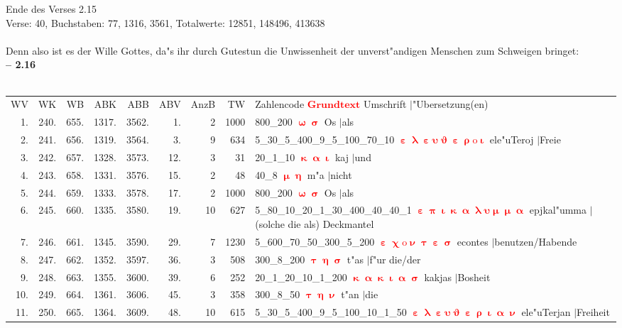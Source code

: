 \documentclass[a4paper,10pt,landscape]{article}
\begin{document}
Ende des Verses 2.15\\
Verse: 40, Buchstaben: 77, 1316, 3561, Totalwerte: 12851, 148496, 413638\\
\\
Denn also ist es der Wille Gottes, da"s ihr durch Gutestun die Unwissenheit der unverst"andigen Menschen zum Schweigen bringet:\\
\newpage 
{\bf -- 2.16}\\
\medskip \\
\begin{tabular}{rrrrrrrrp{120mm}}
WV&WK&WB&ABK&ABB&ABV&AnzB&TW&Zahlencode \textcolor{red}{$\boldsymbol{Grundtext}$} Umschrift $|$"Ubersetzung(en)\\
1.&240.&655.&1317.&3562.&1.&2&1000&800\_200 \textcolor{red}{$\boldsymbol{\upomega\upsigma}$} Os $|$als\\
2.&241.&656.&1319.&3564.&3.&9&634&5\_30\_5\_400\_9\_5\_100\_70\_10 \textcolor{red}{$\boldsymbol{\upepsilon\uplambda\upepsilon\upsilon\upvartheta\upepsilon\uprho\mathrm{o}\upiota}$} ele"uTeroj $|$Freie\\
3.&242.&657.&1328.&3573.&12.&3&31&20\_1\_10 \textcolor{red}{$\boldsymbol{\upkappa\upalpha\upiota}$} kaj $|$und\\
4.&243.&658.&1331.&3576.&15.&2&48&40\_8 \textcolor{red}{$\boldsymbol{\upmu\upeta}$} m"a $|$nicht\\
5.&244.&659.&1333.&3578.&17.&2&1000&800\_200 \textcolor{red}{$\boldsymbol{\upomega\upsigma}$} Os $|$als\\
6.&245.&660.&1335.&3580.&19.&10&627&5\_80\_10\_20\_1\_30\_400\_40\_40\_1 \textcolor{red}{$\boldsymbol{\upepsilon\uppi\upiota\upkappa\upalpha\uplambda\upsilon\upmu\upmu\upalpha}$} epjkal"umma $|$(solche die als) Deckmantel\\
7.&246.&661.&1345.&3590.&29.&7&1230&5\_600\_70\_50\_300\_5\_200 \textcolor{red}{$\boldsymbol{\upepsilon\upchi\mathrm{o}\upnu\uptau\upepsilon\upsigma}$} econtes $|$benutzen/Habende\\
8.&247.&662.&1352.&3597.&36.&3&508&300\_8\_200 \textcolor{red}{$\boldsymbol{\uptau\upeta\upsigma}$} t"as $|$f"ur die/der\\
9.&248.&663.&1355.&3600.&39.&6&252&20\_1\_20\_10\_1\_200 \textcolor{red}{$\boldsymbol{\upkappa\upalpha\upkappa\upiota\upalpha\upsigma}$} kakjas $|$Bosheit\\
10.&249.&664.&1361.&3606.&45.&3&358&300\_8\_50 \textcolor{red}{$\boldsymbol{\uptau\upeta\upnu}$} t"an $|$die\\
11.&250.&665.&1364.&3609.&48.&10&615&5\_30\_5\_400\_9\_5\_100\_10\_1\_50 \textcolor{red}{$\boldsymbol{\upepsilon\uplambda\upepsilon\upsilon\upvartheta\upepsilon\uprho\upiota\upalpha\upnu}$} ele"uTerjan $|$Freiheit\\

\end{tabular}
\end{document}
